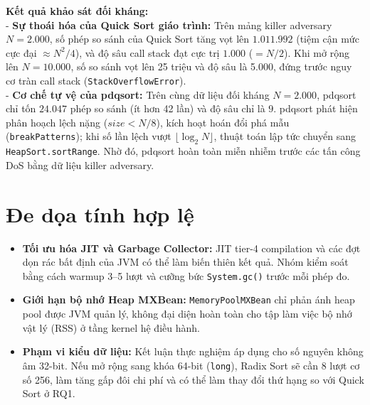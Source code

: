 \documentclass[conference]{IEEEtran}
\begin{document}
\textbf{Kết quả khảo sát đối kháng:}\\
- \textbf{Sự thoái hóa của Quick Sort giáo trình:} Trên mảng killer adversary $N = 2.000$, số phép so sánh của Quick Sort tăng vọt lên $1.011.992$ (tiệm cận mức cực đại $\approx N^2 / 4$), và độ sâu call stack đạt cực trị $1.000$ ($= N/2$). Khi mở rộng lên $N = 10.000$, số so sánh vọt lên 25 triệu và độ sâu là 5.000, đứng trước nguy cơ tràn call stack (\texttt{StackOverflowError}).\\
- \textbf{Cơ chế tự vệ của pdqsort:} Trên cùng dữ liệu đối kháng $N = 2.000$, pdqsort chỉ tốn $24.047$ phép so sánh (ít hơn 42 lần) và độ sâu chỉ là $9$. pdqsort phát hiện phân hoạch lệch nặng ($size < N/8$), kích hoạt hoán đổi phá mẫu (\texttt{breakPatterns}); khi số lần lệch vượt $\lfloor \log_2 N \rfloor$, thuật toán lập tức chuyển sang \texttt{HeapSort.sortRange}. Nhờ đó, pdqsort hoàn toàn miễn nhiễm trước các tấn công DoS bằng dữ liệu killer adversary.

\section{Đe dọa tính hợp lệ}
\begin{itemize}
    \item \textbf{Tối ưu hóa JIT và Garbage Collector:} JIT tier-4 compilation và các đợt dọn rác bất định của JVM có thể làm biến thiên kết quả. Nhóm kiểm soát bằng cách warmup 3--5 lượt và cưỡng bức \texttt{System.gc()} trước mỗi phép đo.
    \item \textbf{Giới hạn bộ nhớ Heap MXBean:} \texttt{MemoryPoolMXBean} chỉ phản ánh heap pool được JVM quản lý, không đại diện hoàn toàn cho tập làm việc bộ nhớ vật lý (RSS) ở tầng kernel hệ điều hành.
    \item \textbf{Phạm vi kiểu dữ liệu:} Kết luận thực nghiệm áp dụng cho số nguyên không âm 32-bit. Nếu mở rộng sang khóa 64-bit (\texttt{long}), Radix Sort sẽ cần 8 lượt cơ số 256, làm tăng gấp đôi chi phí và có thể làm thay đổi thứ hạng so với Quick Sort ở RQ1.
\end{itemize}

\end{document}
